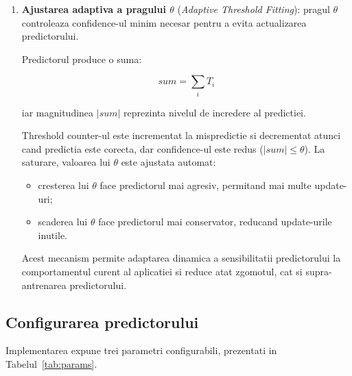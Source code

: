 \begin{enumerate}
    \item \textbf{Ajustarea adaptiva a pragului $\theta$}
          (\textit{Adaptive Threshold Fitting}): pragul $\theta$ controleaza
          confidence-ul minim necesar pentru a evita actualizarea predictorului.

          Predictorul produce o suma:

          \[
              \mathit{sum} = \sum_i T_i
          \]

          iar magnitudinea $|\mathit{sum}|$ reprezinta nivelul de incredere
          al predictiei.

          Threshold counter-ul este incrementat la mispredictie si decrementat
          atunci cand predictia este corecta, dar confidence-ul este redus
          ($|\mathit{sum}| \leq \theta$). La saturare, valoarea lui $\theta$
          este ajustata automat:

          \begin{itemize}
              \item cresterea lui $\theta$ face predictorul mai agresiv,
                    permitand mai multe update-uri;
              \item scaderea lui $\theta$ face predictorul mai conservator,
                    reducand update-urile inutile.
          \end{itemize}

          Acest mecanism permite adaptarea dinamica a sensibilitatii
          predictorului la comportamentul curent al aplicatiei si reduce
          atat zgomotul, cat si supra-antrenarea predictorului.
\end{enumerate}

\subsection{Configurarea predictorului}

Implementarea expune trei parametri configurabili, prezentati in
Tabelul~\ref{tab:params}.

